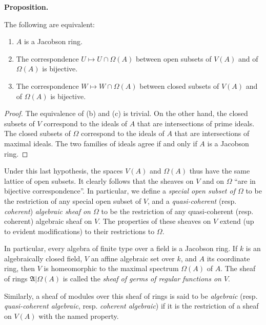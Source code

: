 \documentclass[british]{article}
\providecommand{\tightlist}{%
\setlength{\itemsep}{0pt}\setlength{\parskip}{0pt}}
\newenvironment{itenv}[1]
  {\phantomsection\par\smallskip\noindent\textbf{#1.}\itshape}
  {\par\smallskip}
\newcommand{\oldpage}[1]{\marginpar{\footnotesize$\Big\vert$ \textit{p.~#1}}}
\begin{document}
\protect{}\label{proposition}
\begin{itenv}{Proposition}

The following are equivalent:

\begin{enumerate}
\def\labelenumi{\alph{enumi}.}
\tightlist
\item
  \(A\) is a Jacobson ring.
\item
  The correspondence \(U\mapsto U\cap\Omega(A)\) between open subsets of
  \(V(A)\) and of \(\Omega(A)\) is bijective.
\item
  The correspondence \(W\mapsto W\cap\Omega(A)\) between closed subsets
  of \(V(A)\) and of \(\Omega(A)\) is bijective.
\end{enumerate}

\end{itenv}

\begin{proof}
The equivalence of (b) and (c) is trivial. On the other hand, the closed
subsets of \(V\) correspond to the ideals of \(A\) that are
intersections of prime ideals. The closed subsets of \(\Omega\)
correspond to the ideals of \(A\) that are intersections of maximal
ideals. The two families of ideals agree if and only if \(A\) is a
Jacobson ring.
\end{proof}

Under this last hypothesis, the spaces \(V(A)\) and \(\Omega(A)\) thus
have the same lattice of open subsets. It clearly follows that the
sheaves on \(V\) and on \(\Omega\) ``are in bijective correspondence''.
In particular, we define a \emph{special open subset of \(\Omega\)} to
be the restriction of any special open subset of \(V\), and a
\emph{quasi-coherent} (resp. \emph{coherent}) \emph{algebraic sheaf on
\(\Omega\)} to be the restriction of any quasi-coherent (resp. coherent)
algebraic sheaf on \(V\). The properties of these sheaves on \(V\)
extend (up to evident modifications) to their restrictions to
\(\Omega\).

In particular, every algebra of finite type over a field is a Jacobson
ring. If \(k\) is an algebraically closed field, \(V\) an affine
algebraic set over \(k\), and \(A\) its coordinate ring, then \(V\) is
homeomorphic to the maximal spectrum \(\Omega(A)\) of \(A\).
\oldpage{1-12} The sheaf of rings \(\mathfrak{A}|\Omega(A)\) is called
the \emph{sheaf of germs of regular functions on \(V\)}.

Similarly, a sheaf of modules over this sheaf of rings is said to be
\emph{algebraic} (resp. \emph{quasi-coherent algebraic}, resp.
\emph{coherent algebraic}) if it is the restriction of a sheaf on
\(V(A)\) with the named property.
\end{document}
